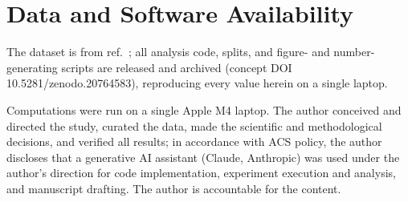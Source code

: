 \documentclass[journal=acsodf,manuscript=article]{achemso}
\begin{document}
\section*{Data and Software Availability}
The dataset is from ref.~; all analysis code, splits, and figure-
and number-generating scripts are released and archived (concept DOI
10.5281/zenodo.20764583), reproducing every value herein on a single laptop.

\begin{acknowledgement}
Computations were run on a single Apple M4 laptop. The author conceived and directed
the study, curated the data, made the scientific and methodological decisions, and
verified all results; in accordance with ACS policy, the author discloses that a
generative AI assistant (Claude, Anthropic) was used under the author's direction for
code implementation, experiment execution and analysis, and manuscript drafting. The
author is accountable for the content.
\end{acknowledgement}

\clearpage

\end{document}
